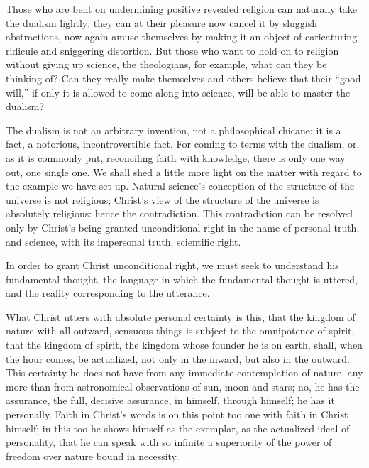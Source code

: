 \documentclass[12pt]{book}
\newcommand{\opage}[1]{\marginnote{\footnotesize\textit{[#1]}}}
\begin{document}
Those who are bent on undermining positive revealed religion can naturally
take the dualism lightly; they can at their pleasure now cancel it by
sluggish
\opage{204}\setcounter{footnote}{0}%
abstractions, now again amuse themselves by making it an object of
caricaturing ridicule and sniggering distortion. But those who want to
hold on to religion without giving up science, the theologians, for
example, what can they be thinking of? Can they really make themselves and
others believe that their ``good will,'' if only it is allowed to come
along into science, will be able to master the dualism?

The dualism is not an arbitrary invention, not a philosophical chicane; it
is a fact, a notorious, incontrovertible fact. For coming to terms with the
dualism, or, as it is commonly put, reconciling faith with knowledge, there
is only one way out, one single one. We shall shed a little more light on
the matter with regard to the example we have set up. Natural science's
conception of the structure of the universe is not religious; Christ's view
of the structure of the universe is absolutely religious: hence the
contradiction. This contradiction can be resolved only by Christ's being
granted unconditional right in the name of personal truth, and science,
with its impersonal truth, scientific right.

In order to grant Christ unconditional right, we must seek to understand
his fundamental thought, the language in which the fundamental thought is
uttered, and the reality corresponding to the utterance.

What Christ utters with absolute personal certainty is this, that the
kingdom of nature with all outward, sensuous things is subject to the
omnipotence of spirit, that the kingdom of spirit, the kingdom whose
founder he is on earth, shall, when the hour comes, be actualized, not only
in the inward, but also in the outward. This certainty he does not have
from any immediate contemplation of nature, any more than from astronomical
observations of sun, moon and stars; no, he has the assurance, the full,
decisive assurance,
\opage{205}\setcounter{footnote}{0}%
in himself, through himself; he has it personally. Faith in Christ's words
is on this point too one with faith in Christ himself; in this too he shows
himself as the exemplar, as the actualized ideal of personality, that he
can speak with so infinite a superiority of the power of freedom over
nature bound in necessity.
\end{document}
